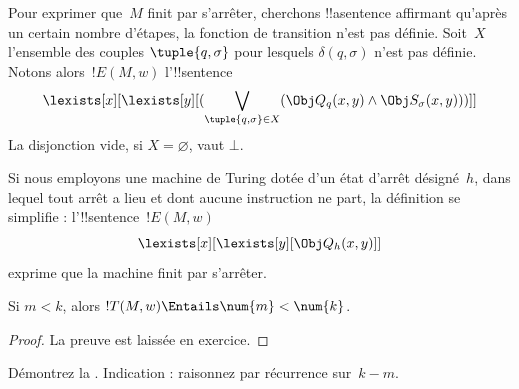 \documentclass[../../../include/open-logic-section]{subfiles}
\begin{document}
Pour exprimer que~$M$ finit par s'arrêter, cherchons !!a{sentence}
affirmant qu'après un certain nombre d'étapes, la fonction de
transition n'est pas définie. Soit~$X$ l'ensemble des couples
$\tuple{q,\sigma}$ pour lesquels $\delta(q,\sigma)$ n'est pas
définie. Notons alors~$!E(M,w)$ l'!!{sentence}
\[
\lexists[x][\lexists[y][(\bigvee_{\tuple{q,\sigma}\in X}
  (\Obj Q_q(x,y)\land\Obj S_\sigma(x,y)))]]
\]
La disjonction vide, si $X=\varnothing$, vaut $\bot$.

Si nous employons une machine de Turing dotée d'un état d'arrêt
désigné~$h$, dans lequel tout arrêt a lieu et dont aucune instruction ne part, la définition se simplifie : l'!!{sentence}~$!E(M,w)$
\[
\lexists[x][\lexists[y][\Obj Q_h(x,y)]]
\]
exprime que la machine finit par s'arrêter.

\begin{prop}
Si $m<k$, alors $!T(M,w)\Entails\num{m}<\num{k}$.
\end{prop}

\begin{proof}
La preuve est laissée en exercice.
\end{proof}

\begin{prob}
Démontrez la .
Indication : raisonnez par récurrence sur~$k-m$.
\end{prob}
\end{document}
